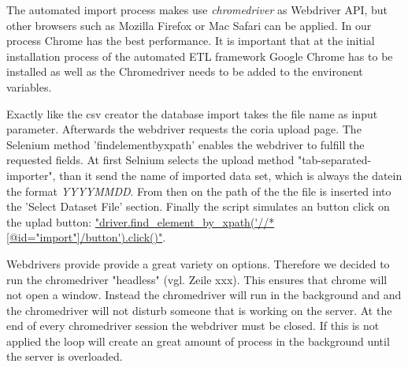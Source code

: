 \documentclass[conference, 11pt]{IEEEtran}
\begin{document}
The automated import process makes use \textit{chromedriver} as Webdriver API, but other browsers such as Mozilla Firefox or Mac Safari can be applied. In our process Chrome has the best performance. It is important that at the initial installation process of the automated ETL framework Google Chrome has to be installed as well as the Chromedriver needs to be added to the environent variables.

Exactly like the csv creator the database import takes the file name as input parameter.
Afterwards the webdriver requests the coria upload page. The Selenium method 'findelementbyxpath' enables the webdriver to fulfill the requested fields.
At first Selnium selects the upload method "tab-separated-importer", than it send the name of imported data set, which is always the datein the format \textit{YYYYMMDD}.
From then on the path of the the file is inserted into the 'Select Dataset File' section. Finally the script simulates an button click on the uplad button:  \url{"driver.find_element_by_xpath('//*[@id="import"]/button').click()"}.

Webdrivers provide provide a great variety on options. Therefore we decided to run the chromedriver "headless" (vgl. Zeile xxx). This ensures that chrome will not open a window. Instead the chromedriver will run in the background and and the chromedriver will not disturb someone that is working on the server.
At the end of every chromedriver session the webdriver must be closed. If this is not applied the loop will create an great amount of process in the background until the server is overloaded.
\end{document}
